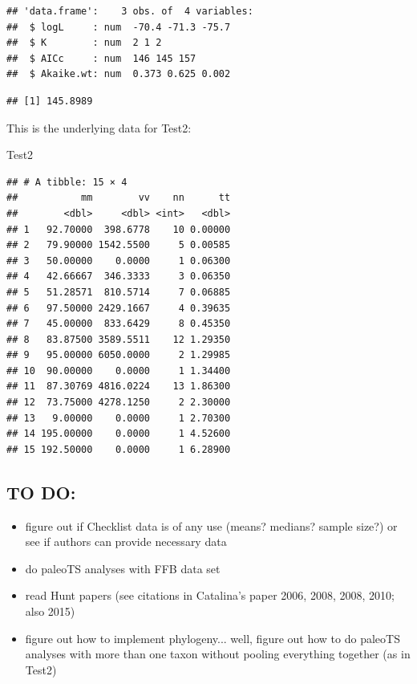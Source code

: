 \documentclass[]{article}
\newenvironment{Shaded}{\begin{snugshade}}{\end{snugshade}}
\newcommand{\DecValTok}[1]{\textcolor[rgb]{0.00,0.00,0.81}{{#1}}}
\newcommand{\CommentTok}[1]{\textcolor[rgb]{0.56,0.35,0.01}{\textit{{#1}}}}
\newcommand{\NormalTok}[1]{{#1}}
\begin{document}
\begin{verbatim}
## 'data.frame':    3 obs. of  4 variables:
##  $ logL     : num  -70.4 -71.3 -75.7
##  $ K        : num  2 1 2
##  $ AICc     : num  146 145 157
##  $ Akaike.wt: num  0.373 0.625 0.002
\end{verbatim}

\begin{Shaded}
\end{Shaded}

\begin{verbatim}
## [1] 145.8989
\end{verbatim}

This is the underlying data for Test2:

\begin{Shaded}
\begin{Highlighting}[]
\NormalTok{Test2}
\end{Highlighting}
\end{Shaded}

\begin{verbatim}
## # A tibble: 15 × 4
##           mm        vv    nn      tt
##        <dbl>     <dbl> <int>   <dbl>
## 1   92.70000  398.6778    10 0.00000
## 2   79.90000 1542.5500     5 0.00585
## 3   50.00000    0.0000     1 0.06300
## 4   42.66667  346.3333     3 0.06350
## 5   51.28571  810.5714     7 0.06885
## 6   97.50000 2429.1667     4 0.39635
## 7   45.00000  833.6429     8 0.45350
## 8   83.87500 3589.5511    12 1.29350
## 9   95.00000 6050.0000     2 1.29985
## 10  90.00000    0.0000     1 1.34400
## 11  87.30769 4816.0224    13 1.86300
## 12  73.75000 4278.1250     2 2.30000
## 13   9.00000    0.0000     1 2.70300
## 14 195.00000    0.0000     1 4.52600
## 15 192.50000    0.0000     1 6.28900
\end{verbatim}

\subsection{TO DO:}\label{to-do}

\begin{itemize}
\item figure out if Checklist data is of any use (means? medians? sample size?) or see if authors can provide necessary data
\item do paleoTS analyses with FFB data set
\item read Hunt papers (see citations in Catalina's paper 2006, 2008, 2008, 2010; also 2015)
\item figure out how to implement phylogeny... well, figure out how to do paleoTS analyses with more than one taxon without pooling everything together (as in Test2)
\end{itemize}
\end{document}

